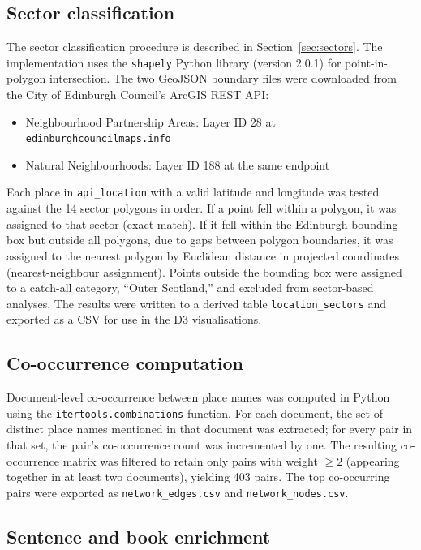 \documentclass[logo,msc]{infthesis}
\begin{document}
\subsection*{Sector classification}
 
The sector classification procedure is described in Section~\ref{sec:sectors}. The implementation uses the \texttt{shapely} Python library (version 2.0.1) for point-in-polygon intersection. The two GeoJSON boundary files were downloaded from the City of Edinburgh Council's ArcGIS REST API:
 
\begin{itemize}
  \item Neighbourhood Partnership Areas: Layer ID 28 at \texttt{edinburghcouncilmaps.info}
  \item Natural Neighbourhoods: Layer ID 188 at the same endpoint
\end{itemize}
 
Each place in \texttt{api\_location} with a valid latitude and longitude was tested against the 14 sector polygons in order. If a point fell within a polygon, it was assigned to that sector (exact match). If it fell within the Edinburgh bounding box but outside all polygons, due to gaps between polygon boundaries, it was assigned to the nearest polygon by Euclidean distance in projected coordinates (nearest-neighbour assignment). Points outside the bounding box were assigned to a catch-all category, ``Outer Scotland,'' and excluded from sector-based analyses. The results were written to a derived table \texttt{location\_sectors} and exported as a CSV for use in the D3 visualisations.
 
\subsection*{Co-occurrence computation}
 
Document-level co-occurrence between place names was computed in Python using the \texttt{itertools.combinations} function. For each document, the set of distinct place names mentioned in that document was extracted; for every pair in that set, the pair's co-occurrence count was incremented by one. The resulting co-occurrence matrix was filtered to retain only pairs with weight $\geq 2$ (appearing together in at least two documents), yielding 403 pairs. The top co-occurring pairs were exported as \texttt{network\_edges.csv} and \texttt{network\_nodes.csv}.

\subsection*{Sentence and book enrichment}
\end{document}
